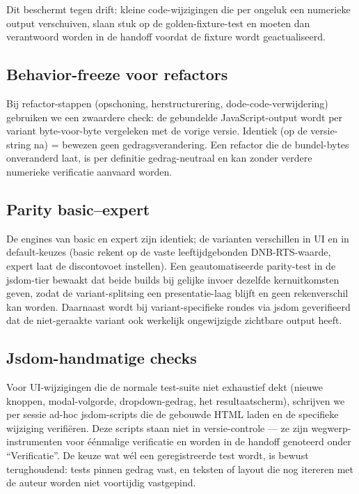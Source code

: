 \documentclass[11pt,a4paper]{article}
\begin{document}
Dit beschermt tegen drift: kleine code-wijzigingen die per ongeluk een numerieke output verschuiven, slaan stuk op de golden-fixture-test en moeten dan verantwoord worden in de handoff voordat de fixture wordt geactualiseerd.

\subsection{Behavior-freeze voor refactors}

Bij refactor-stappen (opschoning, herstructurering, dode-code-verwijdering) gebruiken we een zwaardere check: de gebundelde JavaScript-output wordt per variant byte-voor-byte vergeleken met de vorige versie. Identiek (op de versie-string na) = bewezen geen gedragsverandering. Een refactor die de bundel-bytes onveranderd laat, is per definitie gedrag-neutraal en kan zonder verdere numerieke verificatie aanvaard worden.

\subsection{Parity basic--expert}

De engines van basic en expert zijn identiek; de varianten verschillen in UI en in default-keuzes (basic rekent op de vaste leeftijdgebonden DNB-RTS-waarde, expert laat de discontovoet instellen). Een geautomatiseerde parity-test in de jsdom-tier bewaakt dat beide builds bij gelijke invoer dezelfde kernuitkomsten geven, zodat de variant-splitsing een presentatie-laag blijft en geen rekenverschil kan worden. Daarnaast wordt bij variant-specifieke rondes via jsdom geverifieerd dat de niet-geraakte variant ook werkelijk ongewijzigde zichtbare output heeft.

\subsection{Jsdom-handmatige checks}

Voor UI-wijzigingen die de normale test-suite niet exhaustief dekt (nieuwe knoppen, modal-volgorde, dropdown-gedrag, het resultaatscherm), schrijven we per sessie ad-hoc jsdom-scripts die de gebouwde HTML laden en de specifieke wijziging verifi\"eren. Deze scripts staan niet in versie-controle --- ze zijn wegwerp-instrumenten voor \'e\'enmalige verificatie en worden in de handoff genoteerd onder ``Verificatie''. De keuze wat w\'el een geregistreerde test wordt, is bewust terughoudend: tests pinnen gedrag vast, en teksten of layout die nog itereren met de auteur worden niet voortijdig vastgepind.
\end{document}
